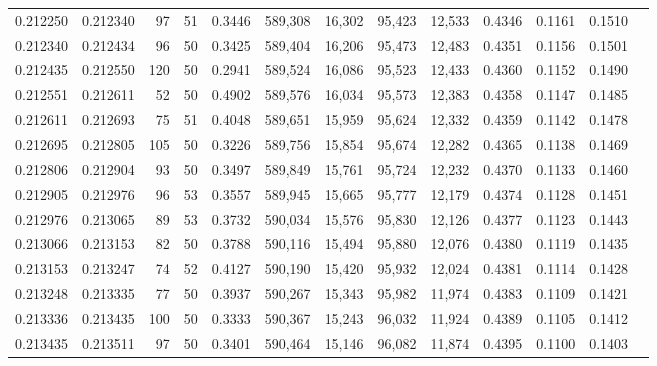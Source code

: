 \begin{tabular}{rrrrrrrrrrrrr}
0.212250 & 0.212340 &    97 &  51 &                                     0.3446 & 589,308 &  16,302 &  95,423 &  12,533 & 0.4346 & 0.1161 & 0.1510 \\
0.212340 & 0.212434 &    96 &  50 &                                     0.3425 & 589,404 &  16,206 &  95,473 &  12,483 & 0.4351 & 0.1156 & 0.1501 \\
0.212435 & 0.212550 &   120 &  50 &                                     0.2941 & 589,524 &  16,086 &  95,523 &  12,433 & 0.4360 & 0.1152 & 0.1490 \\
0.212551 & 0.212611 &    52 &  50 &                                     0.4902 & 589,576 &  16,034 &  95,573 &  12,383 & 0.4358 & 0.1147 & 0.1485 \\
0.212611 & 0.212693 &    75 &  51 &                                     0.4048 & 589,651 &  15,959 &  95,624 &  12,332 & 0.4359 & 0.1142 & 0.1478 \\
0.212695 & 0.212805 &   105 &  50 &                                     0.3226 & 589,756 &  15,854 &  95,674 &  12,282 & 0.4365 & 0.1138 & 0.1469 \\
0.212806 & 0.212904 &    93 &  50 &                                     0.3497 & 589,849 &  15,761 &  95,724 &  12,232 & 0.4370 & 0.1133 & 0.1460 \\
0.212905 & 0.212976 &    96 &  53 &                                     0.3557 & 589,945 &  15,665 &  95,777 &  12,179 & 0.4374 & 0.1128 & 0.1451 \\
0.212976 & 0.213065 &    89 &  53 &                                     0.3732 & 590,034 &  15,576 &  95,830 &  12,126 & 0.4377 & 0.1123 & 0.1443 \\
0.213066 & 0.213153 &    82 &  50 &                                     0.3788 & 590,116 &  15,494 &  95,880 &  12,076 & 0.4380 & 0.1119 & 0.1435 \\
0.213153 & 0.213247 &    74 &  52 &                                     0.4127 & 590,190 &  15,420 &  95,932 &  12,024 & 0.4381 & 0.1114 & 0.1428 \\
0.213248 & 0.213335 &    77 &  50 &                                     0.3937 & 590,267 &  15,343 &  95,982 &  11,974 & 0.4383 & 0.1109 & 0.1421 \\
0.213336 & 0.213435 &   100 &  50 &                                     0.3333 & 590,367 &  15,243 &  96,032 &  11,924 & 0.4389 & 0.1105 & 0.1412 \\
0.213435 & 0.213511 &    97 &  50 &                                     0.3401 & 590,464 &  15,146 &  96,082 &  11,874 & 0.4395 & 0.1100 & 0.1403 \\

\end{tabular}
